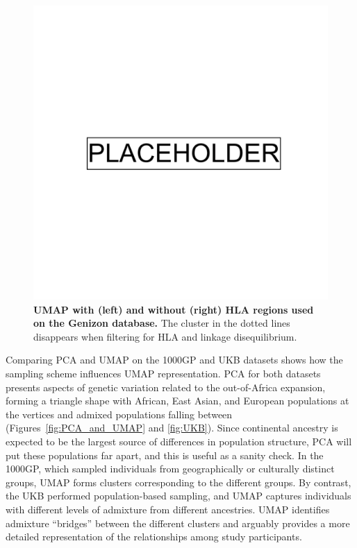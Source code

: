 \clearpage

\begin{figure}[ht]
  \centering
        \includegraphics[width=0.8\linewidth]{placeholder.png}
  \caption[UMAP with and without HLA regions filtered]{\textbf{UMAP with (left) and without (right) HLA regions used on the Genizon database.} The cluster in the dotted lines disappears when filtering for HLA and linkage disequilibrium.}
  \label{fig:HLA}
\end{figure}

\clearpage

Comparing PCA and UMAP on the 1000GP and UKB datasets shows how the sampling scheme influences UMAP representation. PCA for both datasets presents aspects of genetic variation related to the out-of-Africa expansion, forming a triangle shape with African, East Asian, and European populations at the vertices and admixed populations falling between (Figures~\ref{fig:PCA_and_UMAP} and \ref{fig:UKB}). Since continental ancestry is expected to be the largest source of differences in population structure, PCA will put these populations far apart, and this is useful as a sanity check. In the 1000GP, which sampled individuals from geographically or culturally distinct groups, UMAP forms clusters corresponding to the different groups. By contrast, the UKB performed population-based sampling, and UMAP captures individuals with different levels of admixture from different ancestries. UMAP identifies admixture ``bridges'' between the different clusters and arguably provides a more detailed representation of the relationships among study participants. 

